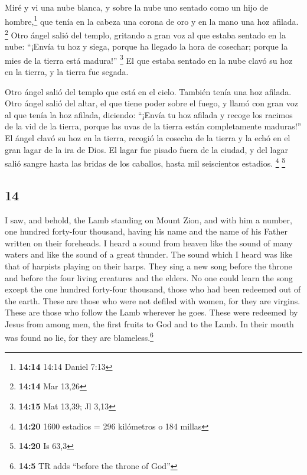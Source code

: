 \begin{paracol}{2}
 Miré y vi una nube blanca, y sobre la nube uno sentado
como un hijo de hombre,\footnote{\textbf{14:14} 14:14 Daniel 7:13} que
tenía en la cabeza una corona de oro y en la mano una hoz afilada.
\footnote{\textbf{14:14} Mar 13,26}  Otro ángel salió del
templo, gritando a gran voz al que estaba sentado en la nube: ``¡Envía
tu hoz y siega, porque ha llegado la hora de cosechar; porque la mies de
la tierra está madura!'' \footnote{\textbf{14:15} Mat 13,39; Jl 3,13}
 El que estaba sentado en la nube clavó su hoz en la
tierra, y la tierra fue segada.

 Otro ángel salió del templo que está en el cielo.
También tenía una hoz afilada.  Otro ángel salió del
altar, el que tiene poder sobre el fuego, y llamó con gran voz al que
tenía la hoz afilada, diciendo: ``¡Envía tu hoz afilada y recoge los
racimos de la vid de la tierra, porque las uvas de la tierra están
completamente maduras!''  El ángel clavó su hoz en la
tierra, recogió la cosecha de la tierra y la echó en el gran lagar de la
ira de Dios.  El lagar fue pisado fuera de la ciudad, y
del lagar salió sangre hasta las bridas de los caballos, hasta mil
seiscientos estadios. \footnote{\textbf{14:20} 1600 estadios = 296
  kilómetros o 184 millas} \footnote{\textbf{14:20} Is 63,3}

\switchcolumn
\begin{otherlanguage}{english}

\hypertarget{section-27}{%
\section{14}\label{section-27}}

 I saw, and behold, the Lamb standing on Mount Zion, and
with him a number, one hundred forty-four thousand, having his name and
the name of his Father written on their foreheads.  I
heard a sound from heaven like the sound of many waters and like the
sound of a great thunder. The sound which I heard was like that of
harpists playing on their harps.  They sing a new song
before the throne and before the four living creatures and the elders.
No one could learn the song except the one hundred forty-four thousand,
those who had been redeemed out of the earth.  These are
those who were not defiled with women, for they are virgins. These are
those who follow the Lamb wherever he goes. These were redeemed by Jesus
from among men, the first fruits to God and to the Lamb. 
In their mouth was found no lie, for they are blameless.\footnote{\textbf{14:5}
  TR adds ``before the throne of God''}


\end{otherlanguage}
\end{paracol}
